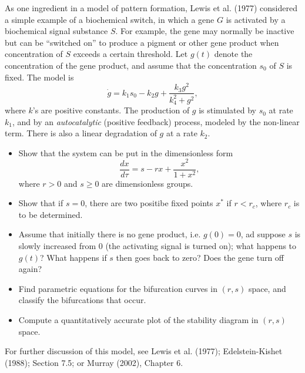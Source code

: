 \documentclass[10pt]{amsart}
\begin{document}
\begin{onehalfspace}
        As one ingredient in a model of pattern formation, Lewis et al. (1977) considered a simple example of a
        biochemical switch, in which a gene $G$ is activated by a biochemical signal substance $S$.
        For example, the gene may normally be inactive but can be ``switched on'' to produce a pigment or other gene
        product when concentration of $S$ exceeds a certain threshold.
        Let $g(t)$ denote the concentration of the gene product, and assume that the concentration $s_0$ of $S$ is
        fixed.
        The model is
        \[
            \dot{g} = k_1 s_0 - k_2 g + \frac{k_3 g^2}{k_4^2 + g^2},
        \]
        where $k$'s are positive constants.
        The production of $g$ is stimulated by $s_0$ at rate $k_1$, and by an \emph{autocatalytic} (positive feedback)
        process, modeled by the non-linear term.
        There is also a linear degradation of $g$ at a rate $k_2$.
        \begin{itemize}
            \item[a)] Show that the system can be put in the dimensionless form
            \[
                \frac{dx}{d\tau} = s - rx + \frac{x^2}{1+x^2},
            \]
            where $r > 0$ and $s\ge 0$ are dimensionless groups.
            \item[b)] Show that if $s = 0$, there are two positibe fixed points $x^*$ if $r < r_c$, where $r_c$ is to
            be determined.
            \item[c)] Assume that initially there is no gene product, i.e. $g(0) = 0$, ad suppose $s$ is slowly
            increased from $0$ (the activating signal is turned on); what happens to $g(t)$?
            What happens if $s$ then goes back to zero?
            Does the gene turn off again?
            \item[d)] Find parametric equations for the bifurcation curves in $(r, s)$ space, and classify
            the bifurcations that occur.
            \item[e)] Compute a quantitatively accurate plot of the stability diagram in $(r, s)$ space.
        \end{itemize}
        For further discussion of this model, see Lewis et al. (1977); Edelstein-Kishet (1988); Section 7.5; or
        Murray (2002), Chapter 6.


\end{onehalfspace}
\end{document}
